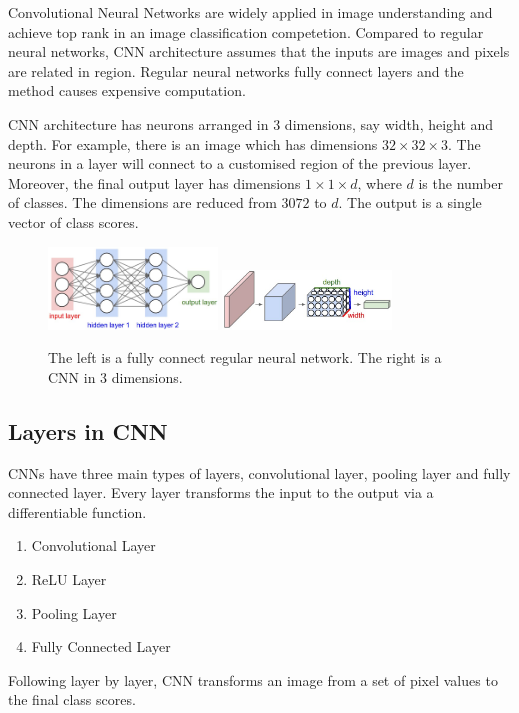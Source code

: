 Convolutional Neural Networks\citep{lecun1998gradient} are widely applied in image understanding and achieve top rank in an image classification competetion\citep{krizhevsky2012imagenet}. Compared to regular neural networks, CNN architecture assumes that the inputs are images and pixels are related in region. Regular neural networks fully connect layers and the method causes expensive computation.

CNN architecture has neurons arranged in 3 dimensions, say width, height and depth. For example, there is an image which has dimensions $32\times 32\times 3$. The neurons in a layer will connect to a customised region of the previous layer. Moreover, the final output layer has dimensions $1\times 1\times d$, where $d$ is the number of classes. The dimensions are reduced from $3072$ to $d$. The output is a single vector of class scores.

\graphicspath{ {./Figures/} }
\begin{figure}[!htb]
\centering
\includegraphics[width=0.4\textwidth]{neural_net2.jpeg}
\includegraphics[width=0.4\textwidth]{cnn.jpeg}
\caption{\label{fig:compareCNNandFC}The left is a fully connect regular neural network. The right is a CNN in 3 dimensions\citep{CNNDiagram}.}
\end{figure}

\subsection{Layers in CNN}
CNNs have three main types of layers, convolutional layer, pooling layer and fully connected layer. Every layer transforms the input to the output via a differentiable function. 
\begin{enumerate}
  \item Convolutional Layer
  \item ReLU Layer
  \item Pooling Layer
  \item Fully Connected Layer
\end{enumerate}
Following layer by layer, CNN transforms an image from a set of pixel values to the final class scores.

